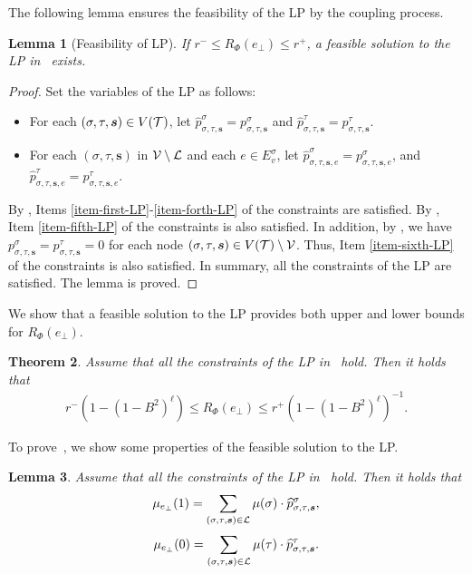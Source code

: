 \documentclass[11pt]{article}
\newtheorem{theorem}{Theorem}
\newtheorem{lemma}[theorem]{Lemma}
\newcommand{\seqS}{\boldsymbol{s}}
\begin{document}
The following lemma ensures the feasibility of the LP by the coupling process.

\begin{lemma}[Feasibility of LP] \label{lem:feasibility-of-LP}
    If $r^- \le R_\Phi(e_\bot) \le r^+$, a feasible solution to the LP in~ exists.
\end{lemma}
\begin{proof}
Set the variables of the LP as follows:
\begin{itemize}
    \item For each $(\sigma, \tau, \seqS) \in V(\+T)$, let $\widehat{p}_{\sigma, \tau, \seqS}^{\sigma} = p_{\sigma, \tau, \seqS}^{\sigma}$ and $\widehat{p}_{\sigma,\tau, \seqS}^{\tau} = p_{\sigma,\tau, \seqS}^{\tau}$.
    \item For each $(\sigma,\tau,\seqS)$ in $\mathcal{V}\setminus \mathcal{L}$ and each $e\in E_v^{\sigma}$, let  $\widehat{p}_{\sigma,\tau,\seqS,e}^{\sigma} = p_{\sigma,\tau,\seqS,e}^{\sigma}$, and $\widehat{p}_{\sigma,\tau,\seqS,e}^{\tau} = p_{\sigma,\tau,\seqS,e}^{\tau}$.
\end{itemize}
By , Items \ref{item-first-LP}-\ref{item-forth-LP} of the constraints are satisfied.
By , Item \ref{item-fifth-LP} of the constraints is also satisfied.
In addition, by , we have $ p^{\sigma}_{\sigma, \tau, \seqS}= p^{\tau}_{\sigma, \tau, \seqS} = 0$ for each node $(\sigma, \tau, \seqS)\in V(\+T)\setminus \+V$.
Thus, Item \ref{item-sixth-LP} of the constraints is also satisfied.
In summary, all the constraints of the LP are satisfied.
The lemma is proved.
\end{proof}


We show that a feasible solution to the LP provides both upper and lower bounds for $R_{\Phi}(e_\bot)$.


\begin{theorem} \label{thm:ratio-bound-by-LP}
    Assume that all the constraints of the LP in~ hold. Then it holds that
    \begin{align*}
        r^{-} \left(1 - \left(1 - B^2\right)^{\ell}\right)\le R_{\Phi}(e_\bot) \le {r^+}\left(1 - \left(1 - B^2\right)^{\ell}\right)^{-1}.
    \end{align*}
\end{theorem}

To prove~, we show some properties of the feasible solution to the LP.

\begin{lemma} \label{lem:ratio-identity}
     Assume that all the constraints of the LP in~ hold. Then it holds that
    \begin{align*}
        \mu_{e_{\bot}}(1) = \sum_{(\sigma, \tau, \seqS) \in \+L}\mu(\sigma)\cdot\widehat{p}_{\sigma, \tau, \seqS}^{\sigma},
    \end{align*}
    \begin{align*}
        \mu_{e_{\bot}}(0)  = \sum_{(\sigma, \tau, \seqS) \in \+L}\mu(\tau)\cdot\widehat{p}_{\sigma, \tau, \seqS}^{\tau}.
    \end{align*}
\end{lemma}
\end{document}
